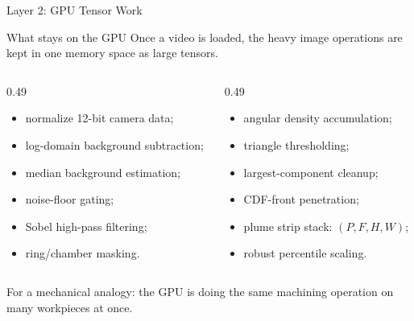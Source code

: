 \documentclass[aspectratio=169,11pt]{beamer}
\begin{document}
\begin{frame}{Layer 2: GPU Tensor Work}
\small
\begin{block}{What stays on the GPU}
Once a video is loaded, the heavy image operations are kept in one memory space as large tensors.
\end{block}

\begin{columns}[T,onlytextwidth]
\begin{column}{0.49\linewidth}
\begin{itemize}
  \item normalize 12-bit camera data;
  \item log-domain background subtraction;
  \item median background estimation;
  \item noise-floor gating;
  \item Sobel high-pass filtering;
  \item ring/chamber masking.
\end{itemize}
\end{column}
\begin{column}{0.49\linewidth}
\begin{itemize}
  \item angular density accumulation;
  \item triangle thresholding;
  \item largest-component cleanup;
  \item CDF-front penetration;
  \item plume strip stack: \((P,F,H,W)\);
  \item robust percentile scaling.
\end{itemize}
\end{column}
\end{columns}

\vspace{0.3em}
\footnotesize
For a mechanical analogy: the GPU is doing the same machining operation on many workpieces at once.
\end{frame}
\end{document}
